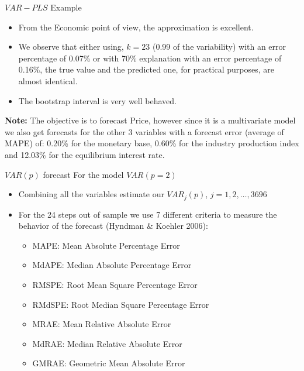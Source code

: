 \documentclass{beamer}
\newcommand{\?}{?`}
\begin{document}
\begin{frame}{$VAR-PLS$ Example}
\begin{footnotesize}
    \begin{itemize}
    \item From the Economic point of view, the approximation is excellent.

\item We observe that either using, $k=23$ (0.99 of the variability)
    with an error percentage of 0.07\% or with 70\% explanation
    with an error percentage of 0.16\%, the true value and the predicted one,
    for practical purposes, are almost identical.

\item The bootstrap interval is very well behaved.

    \end{itemize}
  \end{footnotesize}


  \textbf{Note: } The objective is to forecast Price, however since it is a multivariate model we also get forecasts for the other
  3 variables with a forecast error (average of MAPE) of: 0.20\% for the monetary base,
  0.60\% for the industry production index and 12.03\% for the equilibrium interest rate.

\end{frame}
\begin{frame}{$VAR(p)$ forecast}
  For the model $VAR(p=2)$
  \begin{itemize}
  \item Combining all the variables estimate our
    $VAR_j(p)$, $j=1,2,\ldots,3696$
  \item For the 24 steps out of sample we use 7 different criteria to measure the behavior of the forecast (Hyndman \& Koehler 2006):
  \begin{itemize}
    \item MAPE: Mean Absolute Percentage Error
    \item MdAPE: Median Absolute Percentage Error
    \item RMSPE: Root Mean Square Percentage Error
    \item RMdSPE: Root Median Square Percentage Error
    \item MRAE: Mean Relative Absolute Error
    \item MdRAE: Median Relative Absolute Error
    \item GMRAE: Geometric Mean Absolute Error
    \end{itemize}
  \end{itemize}
\end{frame}
\end{document}
